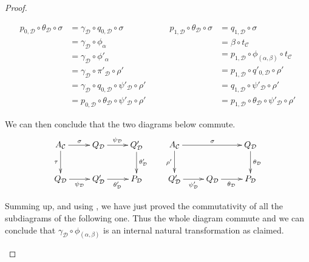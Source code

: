 \documentclass[a4paper,UKenglish,cleveref,pdftex,thm-restate,numberwithinsect]{lipics-v2021}
\begin{document}
\begin{proof}
\begin{enumerate}
\begin{itemize}
			
			\[\begin{split}
				p_{0, \mathcal{D}}\circ \theta_{\mathcal{D}}\circ \sigma &=\gamma_{\mathcal{D}}\circ q_{0, \mathcal{D}}\circ \sigma\\&=  \gamma_{\mathcal{D}}\circ \phi_\alpha
				\\&= \gamma_{\mathcal{D}}\circ \phi'_\alpha 
				\\&= \gamma_{\mathcal{D}}\circ \pi'_{\mathcal{D}}\circ \rho'
				\\&=\gamma_{\mathcal{D}}\circ q_{0, \mathcal{D}}\circ\psi'_{\mathcal{D}} \circ \rho' 
				\\&= p_{0, \mathcal{D}}\circ \theta_{\mathcal{D}}\circ \psi'_{\mathcal{D}}\circ \rho'
			\end{split} \qquad \begin{split}
				p_{1, \mathcal{D}}\circ \theta_{\mathcal{D}} \circ \sigma &=q_{1, \mathcal{D}}\circ  \sigma\\&=\beta\circ t_{\mathcal{C}}\\&=  p_{1, \mathcal{D}}\circ \phi_{(\alpha, \beta)}\circ t_{\mathcal{C}}
				\\&= p_{1, \mathcal{D}}\circ q'_{0, \mathcal{D}}\circ \rho'
				\\&=  q_{1, \mathcal{D}}\circ \psi'_{\mathcal{D}}\circ \rho'
				\\&= p_{1, \mathcal{D}}\circ \theta_{\mathcal{D}}\circ \psi'_{\mathcal{D}}\circ \rho'
			\end{split}\]
			
			We can then conclude that the two diagrams below commute.
			\[\xymatrix{A_{\mathcal{C}} \ar[r]^{\sigma}\ar[d]_{\tau} & Q_{\mathcal{D}} \ar[r]^{\psi_{\mathcal{D}}}&Q'_{\mathcal{D}} \ar[d]^{\theta'_{\mathcal{D}}} & A_{\mathcal{C}} \ar[d]_{\rho'}\ar[rr]^{\sigma} && Q_{\mathcal{D}} \ar[d]^{\theta_{\mathcal{D}}}  \\Q_{\mathcal{D}} \ar[r]_{\psi_{\mathcal{D}}}& Q'_{\mathcal{D}} \ar[r]_{\theta'_{\mathcal{D}}} & P_{\mathcal{D}} &Q'_{\mathcal{D}} \ar[r]_{\psi'_{\mathcal{D}}} & Q_{\mathcal{D}} \ar[r]_{\theta_{\mathcal{D}}}& P_{\mathcal{D}}}\]
			
			Summing up, and using , we have just proved the commutativity of all the subdiagrams of the following one. Thus the whole diagram commute and we can conclude that $\gamma_{\mathcal{D}}\circ \phi_{(\alpha, \beta)}$ is an internal natural transformation as claimed.
			

\end{itemize}
\end{enumerate}
\end{proof}
\end{document}

